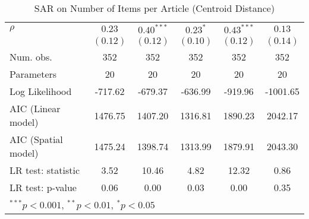 \begin{table}[!h]
\begin{center}
\begin{tabular}{l c c c c c }
$\rho$                  & $0.23$       & $0.40^{***}$  & $0.23^{*}$   & $0.43^{***}$ & $0.13$       \\
                        & $(0.12)$     & $(0.12)$      & $(0.10)$     & $(0.12)$     & $(0.14)$     \\
\midrule
Num. obs.               & 352          & 352           & 352          & 352          & 352          \\
Parameters              & 20           & 20            & 20           & 20           & 20           \\
Log Likelihood          & -717.62      & -679.37       & -636.99      & -919.96      & -1001.65     \\
AIC (Linear model)      & 1476.75      & 1407.20       & 1316.81      & 1890.23      & 2042.17      \\
AIC (Spatial model)     & 1475.24      & 1398.74       & 1313.99      & 1879.91      & 2043.30      \\
LR test: statistic      & 3.52         & 10.46         & 4.82         & 12.32        & 0.86         \\
LR test: p-value        & 0.06         & 0.00          & 0.03         & 0.00         & 0.35         \\
\bottomrule
\multicolumn{6}{l}{\scriptsize{$^{***}p<0.001$, $^{**}p<0.01$, $^*p<0.05$}}
\end{tabular}
\caption{SAR on Number of Items per Article (Centroid Distance)}
\label{table:coefficients}
\end{center}
\end{table}
